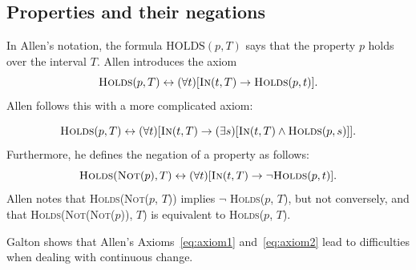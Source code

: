 \subsection{Properties and their negations}
In Allen's notation, the formula $\text{HOLDS}(p, T)$ says that the property $p$ holds over the interval $T$.
Allen introduces the axiom
\begin{equation}
	\textsc{Holds}(p, T) \leftrightarrow (\forall t) [\textsc{In}(t, T) \to \textsc{Holds}(p, t)].
\end{equation}
Allen follows this with a more complicated axiom:

\begin{equation}
	\textsc{Holds}(p, T) \leftrightarrow (\forall t) [\textsc{In}(t, T) \to (\exists s)[\textsc{In}(t, T) \land \textsc{Holds}(p, s)]].
	\label{eq:axiom1}
\end{equation}
Furthermore, he defines the negation of a property as follows:
\begin{equation}
	\textsc{Holds}(\textsc{Not}(p), T) \leftrightarrow (\forall t) [\textsc{In}(t, T) \to \neg \textsc{Holds}(p, t)].
	\label{eq:axiom2}
\end{equation}
Allen notes that \textsc{Holds}(\textsc{Not}($p$, $T$)) implies $\neg$ \textsc{Holds}($p$, $T$), but not conversely, and that \textsc{Holds}(\textsc{Not}(\textsc{Not}($p$)), $T$) is equivalent to \textsc{Holds}($p$, $T$).

Galton shows that Allen's Axioms~\ref{eq:axiom1} and~\ref{eq:axiom2} lead to difficulties when dealing with continuous change.

